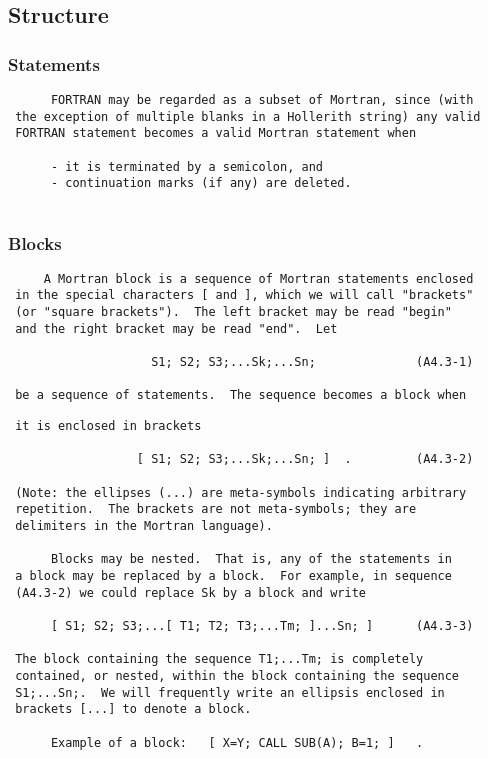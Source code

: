  \subsection{Structure}
 \subsubsection{Statements}
 \begin{verbatim} 
      FORTRAN may be regarded as a subset of Mortran, since (with
 the exception of multiple blanks in a Hollerith string) any valid
 FORTRAN statement becomes a valid Mortran statement when
 
      - it is terminated by a semicolon, and
      - continuation marks (if any) are deleted.
 
 \end{verbatim}
 \subsubsection{Blocks}
 \begin{verbatim}
     A Mortran block is a sequence of Mortran statements enclosed
 in the special characters [ and ], which we will call "brackets"
 (or "square brackets").  The left bracket may be read "begin"
 and the right bracket may be read "end".  Let
 
                    S1; S2; S3;...Sk;...Sn;              (A4.3-1)
 
 be a sequence of statements.  The sequence becomes a block when
\end{verbatim} 
\newpage \begin{verbatim}
 it is enclosed in brackets
 
                  [ S1; S2; S3;...Sk;...Sn; ]  .         (A4.3-2)
 
 (Note: the ellipses (...) are meta-symbols indicating arbitrary
 repetition.  The brackets are not meta-symbols; they are
 delimiters in the Mortran language).
 
      Blocks may be nested.  That is, any of the statements in
 a block may be replaced by a block.  For example, in sequence
 (A4.3-2) we could replace Sk by a block and write
 
      [ S1; S2; S3;...[ T1; T2; T3;...Tm; ]...Sn; ]      (A4.3-3)
 
 The block containing the sequence T1;...Tm; is completely
 contained, or nested, within the block containing the sequence
 S1;...Sn;.  We will frequently write an ellipsis enclosed in
 brackets [...] to denote a block.
 
      Example of a block:   [ X=Y; CALL SUB(A); B=1; ]   .
 
 \end{verbatim}
